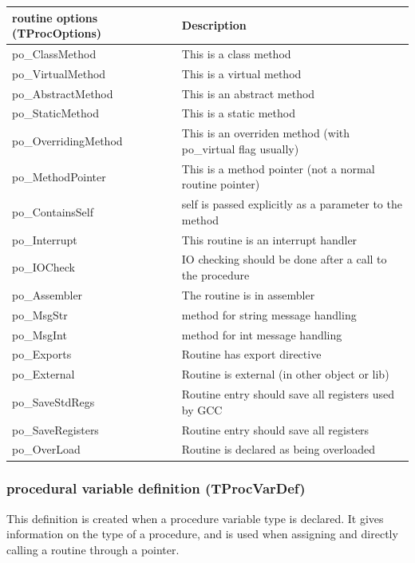 \documentclass [a4paper,12pt]{article}
\begin{document}
\begin{longtable}{|l|p{10cm}|}
\hline
routine options (TProcOptions) & Description \\
\hline
\endhead
\hline
\endfoot
\textsf{po{\_}ClassMethod}   & This is a class method \\
\textsf{po{\_}VirtualMethod }& This is a virtual method \\
\textsf{po{\_}AbstractMethod}& This is an abstract method \\
\textsf{po{\_}StaticMethod}  & This is a static method \\
\textsf{po{\_}OverridingMethod}&
	This is an overriden method (with po{\_}virtual flag usually) \\
\textsf{po{\_}MethodPointer}&
	This is a method pointer (not a normal routine pointer) \\
\textsf{po{\_}ContainsSelf}&
	self is passed explicitly as a parameter to the method \\
\textsf{po{\_}Interrupt}&
	This routine is an interrupt handler \\
\textsf{po{\_}IOCheck}&
	IO checking should be done after a call to the procedure \\
\textsf{po{\_}Assembler}&
	The routine is in assembler \\
\textsf{po{\_}MsgStr}&
	method for string message handling \\
\textsf{po{\_}MsgInt}&
	method for int message handling \\
\textsf{po{\_}Exports}&
	Routine has export directive  \\
\textsf{po{\_}External}&
	Routine is external (in other object or lib) \\
\textsf{po{\_}SaveStdRegs}&
	Routine entry should save all registers used by GCC \\
\textsf{po{\_}SaveRegisters}&
	Routine entry should save all registers \\
\textsf{po{\_}OverLoad}&
	Routine is declared as being overloaded \\
\end{longtable}

\subsubsection{procedural variable definition (TProcVarDef)}
\label{subsubsec:procedural}

This definition is created when a procedure variable type is declared. It
gives information on the type of a procedure, and is used when assigning and
directly calling a routine through a pointer.
\end{document}
